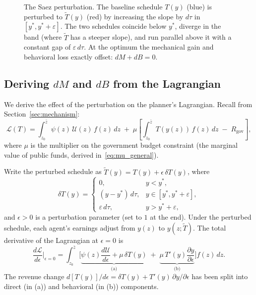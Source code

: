 \documentclass[12pt,a4paper]{article}
\theoremstyle{definition}
\theoremstyle{plain}
\theoremstyle{remark}
\newcommand{\zbar}{\bar{z}}
\newcommand{\zlow}{z_{\scriptscriptstyle 0}}
\newcommand{\calU}{\mathcal{U}}
\begin{document}
\begin{figure}[H]
\caption{The Saez perturbation.
The baseline schedule $T(y)$ (blue) is perturbed to
$\tilde T(y)$ (red) by increasing the slope by $d\tau$
in $[y^*,y^*+\varepsilon]$.
The two schedules coincide below $y^*$, diverge in the band
(where $\tilde T$ has a steeper slope), and run parallel
above it with a constant gap of $\varepsilon\,d\tau$.
At the optimum the mechanical gain and behavioral loss
exactly offset: $dM+dB=0$.}
\label{fig:saez-perturbation}
\end{figure}
\bigskip

\subsection{Deriving $dM$ and $dB$ from the Lagrangian}
\label{sec:mech}

We derive the effect of the perturbation on the planner's
Lagrangian. Recall from Section~\ref{sec:mechanism}:
\[
\mathcal{L}(T)
=
\int_{\zlow}^{\zbar} \psi(z)\,\calU(z)\,f(z)\,dz
\;+\;
\mu
\left[
\int_{\zlow}^{\zbar}
T(y(z))\,f(z)\,dz
\;-\; R_{\mathrm{gov}}
\right],
\]
where $\mu$ is the multiplier on the government budget
constraint (the marginal value of public funds, derived
in~\eqref{eq:mu_general}).

Write the perturbed schedule as
$\tilde T(y) = T(y) + \epsilon\,\delta T(y)$, where
\[
\delta T(y)
=
\begin{cases}
0, & y < y^*,\\
(y-y^*)\,d\tau, & y\in[y^*,y^*+\varepsilon],\\
\varepsilon\,d\tau, & y > y^*+\varepsilon,
\end{cases}
\]
and $\epsilon>0$ is a perturbation parameter (set to $1$ at the
end). Under the perturbed schedule, each agent's earnings adjust
from $y(z)$ to $y(z;\tilde T)$. The total derivative of the
Lagrangian at $\epsilon=0$ is
\begin{equation}
\label{eq:dL-total-1D}
\frac{d\mathcal L}{d\epsilon}\bigg|_{\epsilon=0}
=
\int_{\zlow}^{\zbar}
\biggl[
\underbrace{
  \psi(z)\frac{d\calU}{d\epsilon}
  + \mu\,\delta T(y)
}_{\text{(a)}}
\;+\;
\underbrace{
  \mu\,T'(y)\frac{\partial y}{\partial\epsilon}
}_{\text{(b)}}
\biggr]
f(z)\,dz.
\end{equation}
The revenue change
$d[T(y)]/d\epsilon = \delta T(y) + T'(y)\,\partial y/\partial\epsilon$
has been split into direct (in (a)) and behavioral (in (b))
components.
\end{document}

